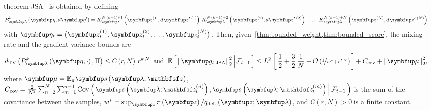 
\begin{theoremEnd}{theorem}\label{thm:jsa}
  JSA~\citep{pmlr-v124-ou20a} is obtained by defining 
  {%
  \begin{align*}
  P_{\vlambda}^k\left(\veta, d\veta^{\prime}\right)
  = 
  K_{\vlambda}^{N\,\left(k-1\right) + 1}\left(\vz^{(1)}, d\vz^{\prime\;(1)}\right)
  \,
  K_{\vlambda}^{N\,\left(k-1\right) + 2}\left(\vz^{(2)}, d\vz^{\prime\;(2)}\right)
  \cdot
  \ldots 
  \cdot
  K_{\vlambda}^{N\,\left(k-1\right) + N}\left(\vz^{(N)}, d\vz^{\prime\;(N)}\right)
  \end{align*}
  }%
  with \(\veta_t = \big(\vz_t^{(1)}, \vz_t^{(2)}, \ldots, \vz_t^{(N)}\big)\).
  Then, given~\cref{thm:bounded_weight,thm:bounded_score}, the mixing rate and the gradient variance bounds are
  {\small
  \begin{align*}
    \DTV{P_{\vlambda}^k\left(\veta, \cdot\right)}{\Pi}
    \leq
    C\left(r, N\right)\,{r}^{k\,N}
    \;\;\text{and}\;\;
    \E{ {\lVert\vg_{t,\mathrm{JSA}}\rVert}^2_2 \,\middle|\, \mathcal{F}_{t-1} }
    \leq
    L^2 \,
    \left[\,
    \frac{1}{2} + \frac{3}{2}\,\frac{1}{N}
    + \mathcal{O}\left(\nicefrac{1}{w^* + r^{t\,N}}\right)
    \,\right]
    +
    C_{\text{cov}}
    +
    {\lVert\vmu\rVert}^2_2,
    \nonumber
  \end{align*}
  }%
  where
  \(\vmu = \mathbb{E}_{\pi}\vs\left(\vlambda;\rvvz\right)\), 
  \(\small\textstyle
  C_{\text{cov}} = \frac{2}{N^2} \sum^{N}_{n=2} \sum^{n-1}_{m = 1} \Cov{\vs\left(\vlambda; \rvvz^{(n)}_t\right), \vs\left(\vlambda; \rvvz^{(m)}_t\right) \,\middle|\, \mathcal{F}_{t-1} }
  \) is the sum of the covariance between the samples, \(w^* = \sup_{\vz} \pi\left(\vz\right) / q_{\text{def.}}\left(\vz;\vlambda\right)\), and \(C\left(r, N\right) > 0\) is a finite constant.
\end{theoremEnd}
